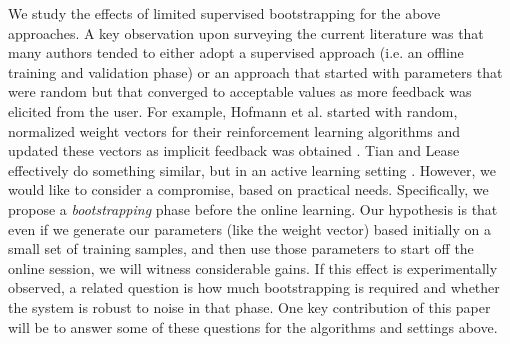 \documentclass{acm_proc_article-sp}
\begin{document}
We study the effects of limited supervised bootstrapping for the above approaches. A key observation upon surveying the current literature was that many authors tended to either adopt a supervised approach (i.e. an offline training and validation phase) or an approach that started with parameters that were random but that converged to acceptable values as more feedback was elicited from the user. For example, Hofmann et al. started with random, normalized weight vectors for their reinforcement learning algorithms and updated these vectors as implicit feedback was obtained \cite{hofmann}. Tian and Lease effectively do something similar, but in an active learning setting \cite{aibo}. However, we would like to consider a compromise, based on practical needs. Specifically, we propose a \emph{bootstrapping} phase before the online learning. Our hypothesis is that even if we generate our parameters (like the weight vector) based initially on a small set of training samples, and then use those parameters to start off the online session, we will witness considerable gains. If this effect is experimentally observed, a related question is how much bootstrapping is required and whether the system is robust to noise in that phase. One key contribution of this paper will be to answer some of these questions for the algorithms and settings above.  
\\ \\
\end{document}
